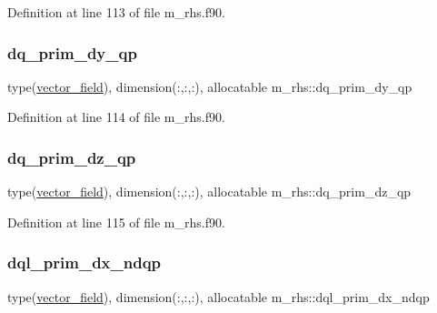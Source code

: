 Definition at line 113 of file m\+\_\+rhs.\+f90.

\mbox{\label{namespacem__rhs_aa727628a4ae8fa3af715f416b7bcadbe}} 
\subsubsection{\texorpdfstring{dq\+\_\+prim\+\_\+dy\+\_\+qp}{dq\_prim\_dy\_qp}}
{\footnotesize\ttfamily type(\hyperlink{structm__derived__types_1_1vector__field}{vector\+\_\+field}), dimension(\+:,\+:,\+:), allocatable m\+\_\+rhs\+::dq\+\_\+prim\+\_\+dy\+\_\+qp}



Definition at line 114 of file m\+\_\+rhs.\+f90.

\mbox{\label{namespacem__rhs_a145666708445ab1fa66bb58fa248b0c1}} 
\subsubsection{\texorpdfstring{dq\+\_\+prim\+\_\+dz\+\_\+qp}{dq\_prim\_dz\_qp}}
{\footnotesize\ttfamily type(\hyperlink{structm__derived__types_1_1vector__field}{vector\+\_\+field}), dimension(\+:,\+:,\+:), allocatable m\+\_\+rhs\+::dq\+\_\+prim\+\_\+dz\+\_\+qp}



Definition at line 115 of file m\+\_\+rhs.\+f90.

\mbox{\label{namespacem__rhs_af321ac08aa0b1f2b444dc81d922445be}} 
\subsubsection{\texorpdfstring{dql\+\_\+prim\+\_\+dx\+\_\+ndqp}{dql\_prim\_dx\_ndqp}}
{\footnotesize\ttfamily type(\hyperlink{structm__derived__types_1_1vector__field}{vector\+\_\+field}), dimension(\+:,\+:,\+:), allocatable m\+\_\+rhs\+::dql\+\_\+prim\+\_\+dx\+\_\+ndqp}



